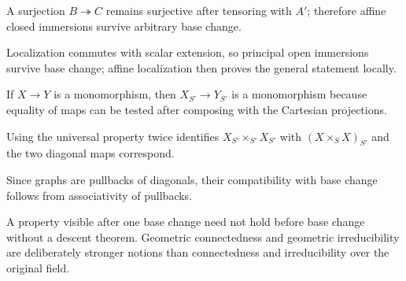 \begin{example}\label{ex:vi24-a09}
A surjection $B\twoheadrightarrow C$ remains surjective after tensoring with $A'$; therefore affine closed immersions survive arbitrary base change.
\end{example}

\begin{example}\label{ex:vi24-a10}
Localization commutes with scalar extension, so principal open immersions survive base change; affine localization then proves the general statement locally.
\end{example}

\begin{example}\label{ex:vi24-a11}
If $X\to Y$ is a monomorphism, then $X_{S'}\to Y_{S'}$ is a monomorphism because equality of maps can be tested after composing with the Cartesian projections.
\end{example}

\begin{example}\label{ex:vi24-a12}
Using the universal property twice identifies $X_{S'}\times_{S'}X_{S'}$ with $(X\times_SX)_{S'}$ and the two diagonal maps correspond.
\end{example}

\begin{example}\label{ex:vi24-a13}
Since graphs are pullbacks of diagonals, their compatibility with base change follows from associativity of pullbacks.
\end{example}

\begin{example}\label{ex:vi24-a14}
A property visible after one base change need not hold before base change without a descent theorem. Geometric connectedness and geometric irreducibility are deliberately stronger notions than connectedness and irreducibility over the original field.
\end{example}
